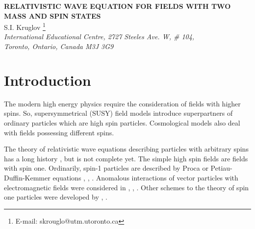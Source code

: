 \documentclass[a4paper,12pt]{article}
\begin{document}
\begin{center}
{\bf RELATIVISTIC WAVE EQUATION FOR FIELDS WITH TWO MASS AND SPIN
STATES}\\
\vspace{5mm}
 S.I. Kruglov \footnote{E-mail: skrouglo@utm.utoronto.ca}\\
\vspace{5mm}
\textit{International Educational Centre, 2727 Steeles Ave. W, \# 104, \\
Toronto, Ontario, Canada M3J 3G9}
\end{center}

\begin{abstract}
I suggest wave equations for the scalar, pseudoscalar, vector, and
pseudovector fields with different masses for spin zero and one
states. Tensor, matrix, and quaternion formulations of fields with
two mass and spin states are considered. This is the
generalization of the Dirac-K\"ahler equation on the case of
different masses of fields with spin one and zero. The equation
matrices obtained are simple linear combinations of matrix
elements in the 16-dimensional space. Spin projection operators
and solutions of equations (for spin one) in the form of
matrix-dyads are obtained. The canonical quantization of fields
under consideration is studied. The anomalous interaction of the
scalar, pseudoscalar, vector, and pseudovector fields with the
external electromagnetic field is considered. Three constants
which characterize the anomalous magnetic moment and quadrupole
electric moment of a particle are introduced.
\end{abstract}

\section{Introduction}

The modern high energy physics require the consideration of fields
with higher spins. So, supersymmetrical (SUSY) field models
introduce superpartners of ordinary particles which are high spin
particles. Cosmological models also deal with fields possessing
different spins.

The theory of relativistic wave equations describing particles
with arbitrary spins has a long history \cite{Fierz}, but is not
complete yet. The simple high spin fields are fields with spin
one. Ordinarily, spin-1 particles are described by Proca
\cite{Proca} or Petiau-Duffin-Kemmer equations \cite{Petiau},
\cite{Duffin}, \cite{Kemmer}. Anomalous interactions of vector
particles with electromagnetic fields were considered in
\cite{Taketani}, \cite{Corben}, \cite{Joung}. Other schemes to the
theory of spin one particles were developed by
\cite{Stueckelberg}, \cite{Lee}.
\end{document}
